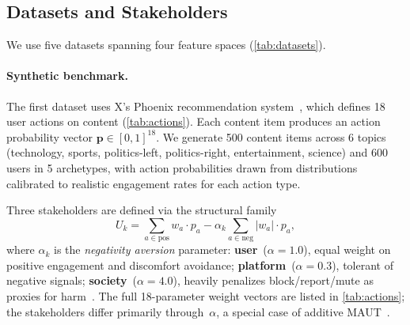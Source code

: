 \documentclass[11pt,letterpaper]{article}
\begin{document}
\subsection{Datasets and Stakeholders}

We use five datasets spanning four feature spaces (\cref{tab:datasets}).

\paragraph{Synthetic benchmark.}

The first dataset uses X's Phoenix recommendation
system~\cite{xalgorithm2023}, which defines 18 user actions on
content (\cref{tab:actions}). Each content item produces an action
probability vector $\mathbf{p} \in [0,1]^{18}$. We generate 500
content items across 6 topics (technology, sports, politics-left,
politics-right, entertainment, science) and 600 users in 5
archetypes, with action probabilities drawn from distributions
calibrated to realistic engagement rates for each action type.

Three stakeholders are defined via the structural family
\begin{equation}
  U_k = \sum_{a \in \text{pos}} w_a \cdot p_a
      - \alpha_k \sum_{a \in \text{neg}} |w_a| \cdot p_a,
  \label{eq:synth_utility}
\end{equation}
where $\alpha_k$ is the \emph{negativity aversion} parameter:
\textbf{user}~($\alpha = 1.0$), equal weight on positive engagement
and discomfort avoidance; \textbf{platform}~($\alpha = 0.3$),
tolerant of negative signals; \textbf{society}~($\alpha = 4.0$),
heavily penalizes block/report/mute as proxies for
harm~\cite{bail2018exposure}. The full 18-parameter weight vectors
are listed in \cref{tab:actions}; the stakeholders differ primarily
through~$\alpha$, a special case of additive
MAUT~\cite{keeney1976decisions}.
\end{document}
